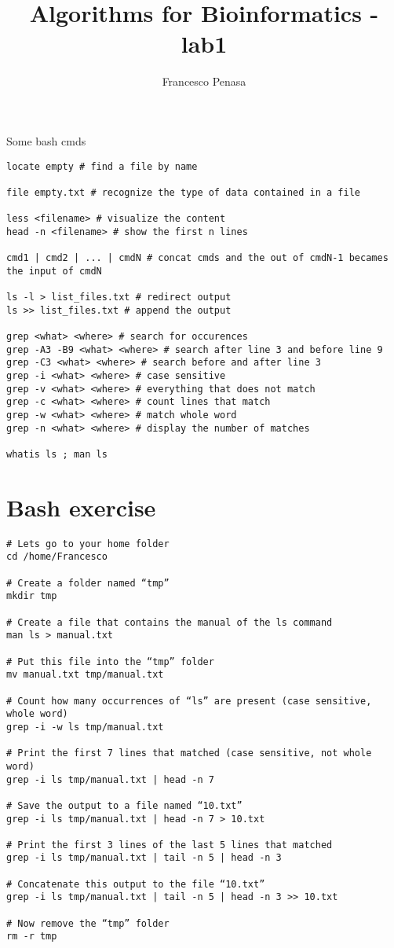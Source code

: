 \documentclass[11pt]{article}
\begin{document}
\author{Francesco Penasa}
\title{Algorithms for Bioinformatics - lab1}
\maketitle

\medskip
Some bash cmds
\begin{lstlisting}
locate empty # find a file by name

file empty.txt # recognize the type of data contained in a file

less <filename> # visualize the content
head -n <filename> # show the first n lines

cmd1 | cmd2 | ... | cmdN # concat cmds and the out of cmdN-1 becames the input of cmdN

ls -l > list_files.txt # redirect output
ls >> list_files.txt # append the output 

grep <what> <where> # search for occurences
grep -A3 -B9 <what> <where> # search after line 3 and before line 9
grep -C3 <what> <where> # search before and after line 3
grep -i <what> <where> # case sensitive
grep -v <what> <where> # everything that does not match
grep -c <what> <where> # count lines that match
grep -w <what> <where> # match whole word
grep -n <what> <where> # display the number of matches 

whatis ls ; man ls
\end{lstlisting}

\section{Bash exercise} %
\label{sec:bash_exercise}
\begin{lstlisting}
# Lets go to your home folder 
cd /home/Francesco 

# Create a folder named “tmp”
mkdir tmp  

# Create a file that contains the manual of the ls command
man ls > manual.txt 

# Put this file into the “tmp” folder
mv manual.txt tmp/manual.txt  

# Count how many occurrences of “ls” are present (case sensitive, whole word) 
grep -i -w ls tmp/manual.txt 

# Print the first 7 lines that matched (case sensitive, not whole word) 
grep -i ls tmp/manual.txt | head -n 7 

# Save the output to a file named “10.txt” 
grep -i ls tmp/manual.txt | head -n 7 > 10.txt 

# Print the first 3 lines of the last 5 lines that matched 
grep -i ls tmp/manual.txt | tail -n 5 | head -n 3

# Concatenate this output to the file “10.txt”
grep -i ls tmp/manual.txt | tail -n 5 | head -n 3 >> 10.txt 

# Now remove the “tmp” folder
rm -r tmp 
\end{lstlisting}

\end{document}
